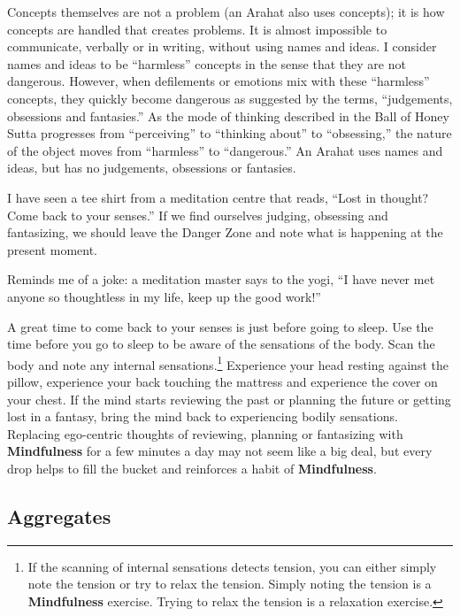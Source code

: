 Concepts themselves are not a problem (an Arahat also uses concepts); it is how concepts are handled that creates problems. It is almost impossible to communicate, verbally or in writing, without using names and ideas. I consider names and ideas to be “harmless” concepts in the sense that they are not dangerous. However, when defilements or emotions mix with these “harmless” concepts, they quickly become dangerous as suggested by the terms, “judgements, obsessions and fantasies.” As the mode of thinking described in the Ball of Honey Sutta progresses from “perceiving” to “thinking about” to “obsessing,” the nature of the object moves from “harmless” to “dangerous.” An Arahat uses names and ideas, but has no judgements, obsessions or fantasies.

I have seen a tee shirt from a meditation centre that reads, “Lost in thought? Come back to your senses.” If we find ourselves judging, obsessing and fantasizing, we should leave the Danger Zone and note what is happening at the present moment. 

Reminds me of a joke: a meditation master says to the yogi, “I have never met anyone so thoughtless in my life, keep up the good work!”

\pagebreak

A great time to come back to your senses is just before going to sleep. Use the time before you go to sleep to be aware of the sensations of the body. Scan the body and note any internal sensations.\footnote{If the scanning of internal sensations detects tension, you can either simply note the tension or try to relax the tension. Simply noting the tension is a \textbf{Mindfulness} exercise. Trying to relax the tension is a relaxation exercise.} Experience your head resting against the pillow, experience your back touching the mattress and experience the cover on your chest. If the mind starts reviewing the past or planning the future or getting lost in a fantasy, bring the mind back to experiencing bodily sensations. Replacing ego-centric thoughts of reviewing, planning or fantasizing with \textbf{Mindfulness} for a few minutes a day may not seem like a big deal, but every drop helps to fill the bucket and reinforces a habit of \textbf{Mindfulness}.

\subsection*{Aggregates}

